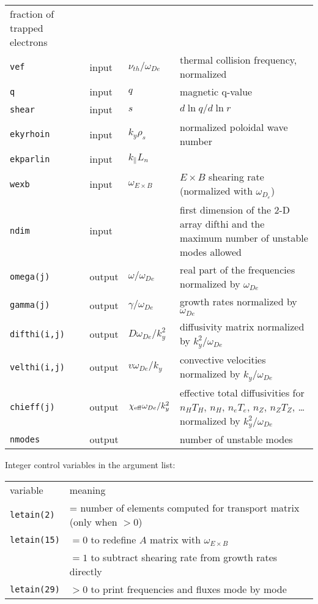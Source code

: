 \begin{center}
\begin{tabular}{lllp{3.0in}}
    fraction of trapped electrons \\
{\tt vef}       & input & $ \nu_{th} / \omega_{De} $ &
     thermal collision frequency, normalized \\
{\tt q}         & input & $ q $ & magnetic q-value \\
{\tt shear}     & input & $ s $ & $ d \ln q / d \ln r $ \\
{\tt ekyrhoin}  & input & $ k_y \rho_s $ & normalized poloidal
                    wave number \\
{\tt ekparlin}  & input & $k_\parallel L_n$ & \\
{\tt wexb}      & input & $\omega_{E\times B}$& $E\times B$ shearing rate 
(normalized with $\omega_{D_e}$) \\
{\tt ndim} & input & & first dimension of the 2-D array difthi
               and the maximum number of unstable modes allowed \\
{\tt omega(j)}  & output & $\omega / \omega_{De} $ &
     real part of the frequencies normalized by $ \omega_{De} $ \\
{\tt gamma(j)}  & output & $\gamma / \omega_{De} $ &
     growth rates normalized by $ \omega_{De} $ \\
{\tt difthi(i,j)}      & output & $ D \omega_{De} / k_y^2 $
      & diffusivity matrix normalized by $ k_y^2 / \omega_{De} $ \\
{\tt velthi(i,j)}      & output & $ v \omega_{De} / k_y $
      & convective velocities normalized by $ k_y / \omega_{De} $ \\
{\tt chieff(j)} & output & $ \chi_{\rm eff} \omega_{De} / k_y^2 $ 
      & effective total diffusivities
        for $ n_H T_H $, $ n_H $, $ n_e T_e $, 
        $ n_Z $, $ n_Z T_Z $, \ldots
        normalized by $ k_y^2 / \omega_{De} $ \\
{\tt nmodes} & output & & number of unstable modes \\

\end{tabular}
\end{center}

\newpage
\renewcommand{\arraystretch}{1.0}
\begin{center}
Integer control variables in the argument list:
\begin{tabular}{lp{4.0in}}
variable & meaning \\
{\tt letain(2)} & = number of elements computed for transport matrix
                    (only when $> 0$) \\
{\tt letain(15)} & $ = 0 $ to redefine $A$ matrix with $\omega_{E\times B}$ \\
                 & $ = 1 $ to subtract shearing rate from growth rates directly \\
{\tt letain(29)} & $ > 0 $ to print frequencies and fluxes mode by mode \\

\end{tabular}
\end{center}

